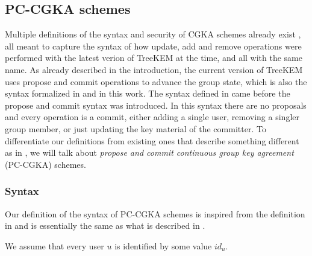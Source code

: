 \subsection{PC-CGKA schemes}

Multiple definitions of the syntax and security of CGKA schemes already exist \cite{rtreekem,ttkem,modular-group-messaging}, all meant to capture the syntax of how update, add and remove operations were performed with the latest verion of TreeKEM at the time, and all with the same name. As already described in the introduction, the current version of TreeKEM uses propose and commit operations to advance the group state, which is also the syntax formalized in \cite{modular-group-messaging} and in this work. The syntax defined in \cite{rtreekem,ttkem} came before the propose and commit syntax was introduced. In this syntax there are no proposals and every operation is a commit, either adding a single user, removing a singler group member, or just updating the key material of the committer. To differentiate our definitions from existing ones that describe something different as in \cite{rtreekem,ttkem}, we will talk about \emph{propose and commit continuous group key agreement} (PC-CGKA) schemes.

\subsubsection{Syntax}

Our definition of the syntax of PC-CGKA schemes is inspired from the definition in \cite{ttkem} and is essentially the same as what is described in \cite[Section 4.1.1]{modular-group-messaging}.

We assume that every user $u$ is identified by some value $id_u$.

